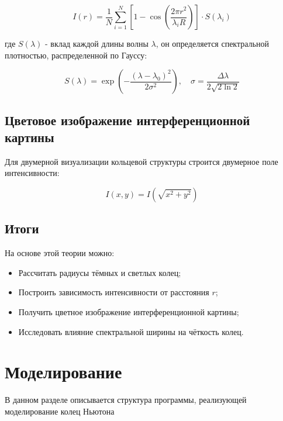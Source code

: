 \documentclass[a4paper,11pt]{article}
\theoremstyle{definition}
\begin{document}
    \begin{equation}
        I(r) = \frac{1}{N} \sum_{i=1}^{N} \left[1 - \cos\left( \frac{2\pi r^2}{\lambda_i R} \right) \right] \cdot S(\lambda_i)\label{eq:equation7}
    \end{equation}

    где \( S(\lambda) \) - вклад каждой длины волны \(\lambda\), он определяется спектральной плотностью,
    распределенной по Гауссу:

    \begin{equation}
        S(\lambda) = \exp\left( -\frac{(\lambda - \lambda_0)^2}{2\sigma^2} \right), \quad \sigma = \frac{\Delta\lambda}{2\sqrt{2 \ln 2}}\label{eq:equation8}
    \end{equation}

    \subsection{Цветовое изображение интерференционной картины}
    Для двумерной визуализации кольцевой структуры строится двумерное поле интенсивности:

    \begin{equation}
        I(x, y) = I\left( \sqrt{x^2 + y^2} \right)\label{eq:equation9}
    \end{equation}

    \subsection{Итоги}
    На основе этой теории можно:
    \begin{itemize}
        \item Рассчитать радиусы тёмных и светлых колец;
        \item Построить зависимость интенсивности от расстояния \( r \);
        \item Получить цветное изображение интерференционной картины;
        \item Исследовать влияние спектральной ширины на чёткость колец.
    \end{itemize}


    \newpage
    \section{Моделирование}

    В данном разделе описывается структура программы, реализующей моделирование колец Ньютона
\end{document}
